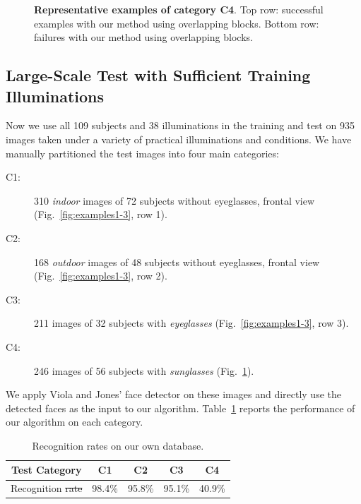 \documentclass[12pt,journal,draftcls,letterpaper,onecolumn]{IEEEtran}
\providecommand{\DIFadd}[1]{{\protect\color{blue}\uwave{#1}}} %
\providecommand{\DIFdel}[1]{{\protect\color{red}\sout{#1}}}                      %
\providecommand{\DIFaddFL}[1]{\DIFadd{#1}} %
\providecommand{\DIFdelFL}[1]{\DIFdel{#1}} %
\providecommand{\DIFaddbeginFL}{} %
\providecommand{\DIFaddendFL}{} %
\providecommand{\DIFdelbeginFL}{} %
\providecommand{\DIFdelendFL}{} %
\begin{document}
\begin{figure}[t]
 \DIFaddbeginFL \vspace{-.2in}
 \DIFaddendFL \caption{{\bf Representative examples of category C4}. Top row: successful examples with our method using overlapping blocks. Bottom row: failures with our method using overlapping blocks.}\label{fig:examples4}
\DIFdelbeginFL %
\DIFdelendFL \DIFaddbeginFL \vspace{-.5in}
\DIFaddendFL \end{figure}

\subsection{Large-Scale Test with Sufficient Training
Illuminations} Now we use all 109 subjects and 38 illuminations
in the training and test on 935 images taken under a variety of
practical illuminations and conditions. We have manually partitioned the test images into four main
categories:
\begin{description}
\item[C1:] 310 \emph{indoor} images of 72 subjects without
    eyeglasses, frontal view
    (Fig.~\ref{fig:examples1-3}, row 1).
\item[C2:] 168 \emph{outdoor} images of 48 subjects without
    eyeglasses, frontal view
    (Fig.~\ref{fig:examples1-3}, row 2).
\item[C3:] 211 images of 32 subjects with \emph{eyeglasses}
    (Fig.~\ref{fig:examples1-3}, row 3).
\item[C4:] 246 images of 56 subjects with \emph{sunglasses}
    (Fig.~\ref{fig:examples4}).
\end{description}
We apply Viola and Jones' face detector on these images and
directly use the detected faces as the input to our algorithm.
Table~\ref{tab:UIUC-recognition} reports the performance of our
algorithm on each category.
\begin{table}
\DIFaddbeginFL \vspace{-.1in}	
\DIFaddendFL \centering \caption{Recognition rates on our own database.}
\DIFaddbeginFL \vspace{-.2in}
\DIFaddendFL \begin{tabular}{|c|c|c|c|c| }
\hline
Test Category & C1 & C2 & C3 & C4  \\
\hline
\hline
Recognition \DIFdelbeginFL \DIFdelFL{rate }\DIFdelendFL \DIFaddbeginFL \DIFaddFL{Rate }\DIFaddendFL & 98.4\% & 95.8\% & 95.1\% & 40.9\% \\
\hline
\end{tabular}
\label{tab:UIUC-recognition}
\DIFdelbeginFL %
\DIFdelendFL \DIFaddbeginFL \vspace{-.4in}
\DIFaddendFL \end{table}
\end{document}
